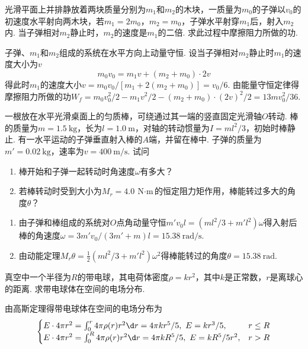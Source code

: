 \begin{problem}
    光滑平面上并排静放着两块质量分别为$m_1$和$m_2$的木块，一质量为$m_0$的子弹以$v_0$的初速度水平射向两木块，若$m_1=2m_0$，$m_2=m_0$，子弹水平射穿$m_1$后，射入$m_2$内. 当子弹相对$m_2$静止时，$m_2$的速度是$m_1$的二倍. 求此过程中摩擦阻力所做的功.
\end{problem}
\begin{solution}
    子弹、$m_1$和$m_2$组成的系统在水平方向上动量守恒. 设当子弹相对$m_2$静止时$m_1$的速度大小为$v$
    \[m_0v_0=m_1v+(m_2+m_0)\cdot2v\]
    得此时$m_1$的速度大小$v=m_0v_0/[m_1+2(m_2+m_0)]=v_0/6$. 由能量守恒定律得摩擦阻力所做的功$W_f=m_0v_0^2/2-m_1v^2/2-(m_2+m_0)\cdot(2v)^2/2=13mv_0^2/36$.
\end{solution}

\begin{problem}
    一根放在水平光滑桌面上的匀质棒，可绕通过其一端的竖直固定光滑轴$O$转动. 棒的质量为$m=\qty{1.5}\kg$，长为$l=\qty{1.0}\m$，对轴的转动惯量为$I=ml^2/3$，初始时棒静止. 有一水平运动的子弹垂直射入棒的$A$端，并留在棒中. 子弹的质量为$m'=\qty{0.02}\kg$，速率为$v=\qty{400}{\m/\s}$. 试问
    \begin{enumerate}
        \item 棒开始和子弹一起转动时角速度$\omega$有多大？
        \item 若棒转动时受到大小为$M_r=\qty{4.0}{\N\cdot\m}$的恒定阻力矩作用，棒能转过多大的角度$\theta$？
    \end{enumerate}
\end{problem}
\begin{solution}\leavevmode
    \begin{enumerate}
        \item 由子弹和棒组成的系统对$O$点角动量守恒$m'v_0l=(ml^2/3+m'l^2)\omega$得入射后棒的角速度$\omega=3m'v_0/(3m'+m)l=\qty{15.38}{\radian/\s}$.
        \item 由动能定理$M_r\theta=\frac12(ml^2/3+m'l^2)\omega^2$得棒能转过的角度$\theta=\qty{15.38}{\radian}$.
    \end{enumerate}
\end{solution}

\begin{problem}
    真空中一个半径为$R$的带电球，其电荷体密度$\rho=kr^2$，其中$k$是正常数，$r$是离球心的距离. 求带电球体在空间的电场分布.
\end{problem}
\begin{solution}
    由高斯定理得带电球体在空间的电场分布为
    \[\begin{cases}
        E\cdot4\pi r^2=\int_0^r4\pi\rho(r)r^2\d r=4\pi kr^5/5,\ E=kr^3/5, & r\leq R\\
        E\cdot4\pi r^2=\int_0^R4\pi\rho(r)r^2\d r=4\pi kR^5/5,\ E=kR^5/5r^2, & r>R
    \end{cases}\]
\end{solution}

